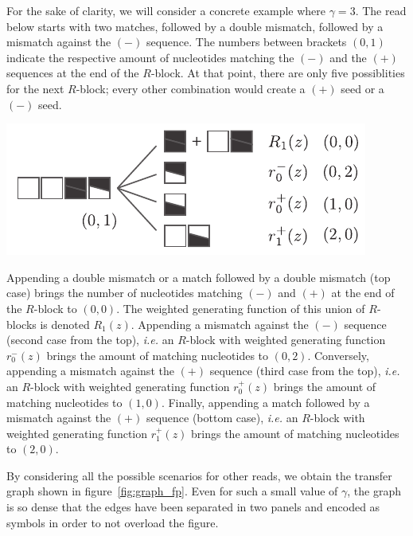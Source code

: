 \documentclass{article}
\newenvironment{inset}
{\vspace{0.5\baselineskip}\begin{center}}
{\end{center}\vspace{0.5\baselineskip}}
\begin{document}
For the sake of clarity, we will consider a concrete example where
$\gamma=3$. The read below starts with two matches, followed by a double
mismatch, followed by a mismatch against the $(-)$ sequence. The numbers
between brackets $(0,1)$ indicate the respective amount of nucleotides
matching the $(-)$ and the $(+)$ sequences at the end of the $R$-block. At
that point, there are only five possiblities for the next $R$-block; every
other combination would create a $(+)$ seed or a $(-)$ seed.

\begin{inset}
\includegraphics[scale=0.9]{example_dual.pdf}
\end{inset}

Appending a double mismatch or a match followed by a double mismatch (top
case) brings the number of nucleotides matching $(-)$ and $(+)$ at the end
of the $R$-block to $(0,0)$. The weighted generating function of this
union of $R$-blocks is denoted $R_1(z)$. Appending a mismatch against the
$(-)$ sequence (second case from the top), \textit{i.e.} an $R$-block with
weighted generating function $r_0^-(z)$ brings the amount of matching
nucleotides to $(0,2)$. Conversely, appending a mismatch against the $(+)$
sequence (third case from the top), \textit{i.e.} an $R$-block with
weighted generating function $r_0^+(z)$ brings the amount of matching
nucleotides to $(1,0)$. Finally, appending a match followed by a mismatch
against the $(+)$ sequence (bottom case), \textit{i.e.} an $R$-block with
weighted generating function $r_1^+(z)$ brings the amount of matching
nucleotides to $(2,0)$.


By considering all the possible scenarios for other reads, we obtain the
transfer graph shown in figure~\ref{fig:graph_fp}. Even for such a small
value of $\gamma$, the graph is so dense that the edges have been
separated in two panels and encoded as symbols in order to not overload
the figure.
\end{document}
